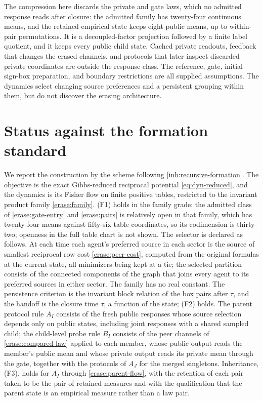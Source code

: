 The compression here discards the private and gate laws, which no admitted response reads after closure: the admitted family has twenty-four continuous means, and the retained empirical state keeps eight public means, up to within-pair permutations. It is a decoupled-factor projection followed by a finite label quotient, and it keeps every public child state. Cached private readouts, feedback that changes the erased channels, and protocols that later inspect discarded private coordinates are outside the response class. The reference, gate, initial sign-box preparation, and boundary restrictions are all supplied assumptions. The dynamics select changing source preferences and a persistent grouping within them, but do not discover the erasing architecture.

\section{Status against the formation standard}
\label{sec:erase-status}

We report the construction by the scheme following \cref{inh:recursive-formation}. The objective is the exact Gibbs-reduced reciprocal potential \cref{eq:dyn-reduced}, and the dynamics is its Fisher flow on finite positive tables, restricted to the invariant product family \cref{erase:family}. (F1) holds in the family grade: the admitted class of \cref{erase:gate-entry} and \cref{erase:pairs} is relatively open in that family, which has twenty-four means against fifty-six table coordinates, so its codimension is thirty-two; openness in the full table chart is not shown. The selector is declared as follows. At each time each agent's preferred source in each sector is the source of smallest reciprocal row cost \cref{erase:peer-cost}, computed from the original formulas at the current state, all minimizers being kept at a tie; the selected partition consists of the connected components of the graph that joins every agent to its preferred sources in either sector. The family has no real constant. The persistence criterion is the invariant block relation of the box pairs after $\tau$, and the handoff is the closure time $\tau$, a function of the state; (F2) holds. The parent protocol rule $A_I$ consists of the fresh public responses whose source selection depends only on public states, including joint responses with a shared sampled child; the child-level probe rule $B_I$ consists of the peer channels of \cref{erase:compared-law} applied to each member, whose public output reads the member's public mean and whose private output reads its private mean through the gate, together with the protocols of $A_J$ for the merged singletons. Inheritance, (F3), holds for $A_I$ through \cref{erase:parent-flow}, with the retention of each pair taken to be the pair of retained measures and with the qualification that the parent state is an empirical measure rather than a law pair.

